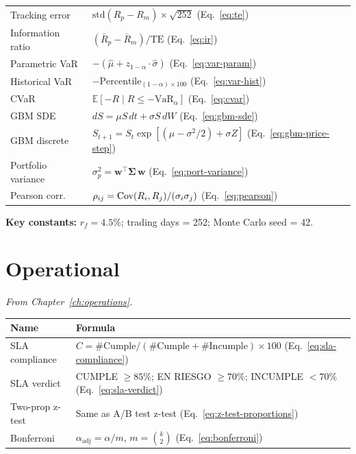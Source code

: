 \begin{tabularx}{\textwidth}{lX}
Tracking error &
$\text{std}(R_p - R_m) \times \sqrt{252}$
\quad (Eq.~\ref{eq:te}) \\[8pt]

Information ratio &
$(\bar{R}_p - \bar{R}_m) / \text{TE}$
\quad (Eq.~\ref{eq:ir}) \\[8pt]

Parametric VaR &
$-(\hat{\mu} + z_{1-\alpha} \cdot \hat{\sigma})$
\quad (Eq.~\ref{eq:var-param}) \\[8pt]

Historical VaR &
$-\text{Percentile}_{(1-\alpha)\times 100}$
\quad (Eq.~\ref{eq:var-hist}) \\[8pt]

CVaR &
$\mathbb{E}[-R \mid R \leq -\text{VaR}_\alpha]$
\quad (Eq.~\ref{eq:cvar}) \\[8pt]

GBM SDE &
$dS = \mu S\,dt + \sigma S\,dW$
\quad (Eq.~\ref{eq:gbm-sde}) \\[8pt]

GBM discrete &
$S_{t+1} = S_t \exp[(\mu - \sigma^2/2) + \sigma Z]$
\quad (Eq.~\ref{eq:gbm-price-step}) \\[8pt]

Portfolio variance &
$\sigma_p^2 = \boldsymbol{w}^\top \boldsymbol{\Sigma}\, \boldsymbol{w}$
\quad (Eq.~\ref{eq:port-variance}) \\[8pt]

Pearson corr.\ &
$\rho_{ij} = \operatorname{Cov}(R_i, R_j) / (\sigma_i \sigma_j)$
\quad (Eq.~\ref{eq:pearson}) \\
\bottomrule
\end{tabularx}

\medskip
\noindent\textbf{Key constants:} $r_f = 4.5\%$; trading days = 252; Monte Carlo seed = 42.

\section{Operational}

\noindent\textit{From Chapter~\ref{ch:operations}.}

\medskip

\begin{tabularx}{\textwidth}{lX}
\toprule
\textbf{Name} & \textbf{Formula} \\
\midrule
SLA compliance &
$C = \text{\#Cumple} / (\text{\#Cumple} + \text{\#Incumple}) \times 100$
\quad (Eq.~\ref{eq:sla-compliance}) \\[8pt]

SLA verdict &
CUMPLE $\geq 85\%$; EN RIESGO $\geq 70\%$; INCUMPLE $< 70\%$
\quad (Eq.~\ref{eq:sla-verdict}) \\[8pt]

Two-prop z-test &
Same as A/B test z-test
\quad (Eq.~\ref{eq:z-test-proportions}) \\[8pt]

Bonferroni &
$\alpha_{\text{adj}} = \alpha / m$, \; $m = \binom{k}{2}$
\quad (Eq.~\ref{eq:bonferroni}) \\
\bottomrule
\end{tabularx}
